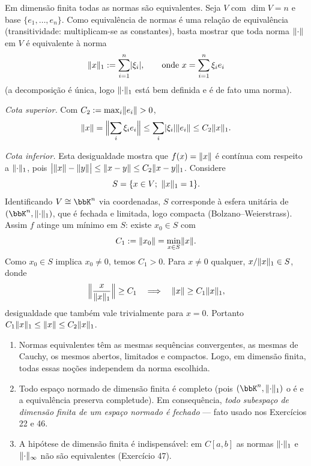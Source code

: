 \begin{exercicio}{Em dimensão finita todas as normas são equivalentes.}
\sol
Seja $V$ com $\dim V=n$ e base $\{e_1,\dots,e_n\}$. Como equivalência de normas é uma relação de equivalência (transitividade: multiplicam-se as constantes), basta mostrar que toda norma $\lVert\cdot\rVert$ em $V$ é equivalente à norma
\[ \lVert x\rVert_1:=\sum_{i=1}^{n}\lvert\xi_i\rvert,\qquad \text{onde } x=\sum_{i=1}^n\xi_ie_i \]
(a decomposição é única, logo $\lVert\cdot\rVert_1$ está bem definida e é de fato uma norma).

\emph{Cota superior.} Com $C_2:=\max_i\lVert e_i\rVert>0$,
\[ \lVert x\rVert=\Bigl\|\sum_i\xi_ie_i\Bigr\|\le\sum_i\lvert\xi_i\rvert\lVert e_i\rVert\le C_2\lVert x\rVert_1. \]

\emph{Cota inferior.} Esta desigualdade mostra que $f(x)=\lVert x\rVert$ é contínua com respeito a $\lVert\cdot\rVert_1$, pois $\bigl|\lVert x\rVert-\lVert y\rVert\bigr|\le\lVert x-y\rVert\le C_2\lVert x-y\rVert_1$. Considere
\[ S=\{x\in V;\ \lVert x\rVert_1=1\}. \]
Identificando $V\cong\bbK^n$ via coordenadas, $S$ corresponde à esfera unitária de $(\bbK^n,\norm{\cdot}_1)$, que é fechada e limitada, logo compacta (Bolzano--Weierstrass). Assim $f$ atinge um mínimo em $S$: existe $x_0\in S$ com
\[ C_1:=\lVert x_0\rVert=\min_{x\in S}\lVert x\rVert. \]
Como $x_0\in S$ implica $x_0\neq0$, temos $C_1>0$. Para $x\neq0$ qualquer, $x/\lVert x\rVert_1\in S$, donde
\[ \Bigl\|\frac{x}{\lVert x\rVert_1}\Bigr\|\ge C_1 \quad\Longrightarrow\quad \lVert x\rVert\ge C_1\lVert x\rVert_1, \]
desigualdade que também vale trivialmente para $x=0$. Portanto $C_1\lVert x\rVert_1\le\lVert x\rVert\le C_2\lVert x\rVert_1$.

\begin{obs}[Consequências]
\begin{enumerate}[label=(\roman*),leftmargin=1.6em,itemsep=2pt]
\item Normas equivalentes têm as mesmas sequências convergentes, as mesmas de Cauchy, os mesmos abertos, limitados e compactos. Logo, em dimensão finita, todas essas noções independem da norma escolhida.
\item Todo espaço normado de dimensão finita é completo (pois $(\bbK^n,\norm{\cdot}_1)$ o é e a equivalência preserva completude). Em consequência, \emph{todo subespaço de dimensão finita de um espaço normado é fechado} --- fato usado nos Exercícios 22 e 46.
\item A hipótese de dimensão finita é indispensável: em $C[a,b]$ as normas $\lVert\cdot\rVert_1$ e $\lVert\cdot\rVert_\infty$ não são equivalentes (Exercício 47).
\end{enumerate}
\end{obs}
\end{exercicio}

